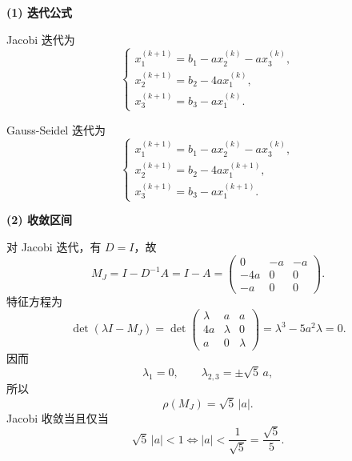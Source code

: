 \documentclass[11pt, a4paper]{ctexart}
\begin{document}
\begin{solution}
    \textbf{(1) 迭代公式}

    Jacobi 迭代为
    \[
        \begin{cases}
            x_1^{(k+1)} = b_1 - a x_2^{(k)} - a x_3^{(k)}, \\
            x_2^{(k+1)} = b_2 - 4a x_1^{(k)}, \\
            x_3^{(k+1)} = b_3 - a x_1^{(k)}.
        \end{cases}
    \]

    Gauss-Seidel 迭代为
    \[
        \begin{cases}
            x_1^{(k+1)} = b_1 - a x_2^{(k)} - a x_3^{(k)}, \\
            x_2^{(k+1)} = b_2 - 4a x_1^{(k+1)}, \\
            x_3^{(k+1)} = b_3 - a x_1^{(k+1)}.
        \end{cases}
    \]

    \textbf{(2) 收敛区间}

    对 Jacobi 迭代，有 $D = I$，故
    \[
        M_J = I - D^{-1}A = I - A
        =
        \begin{pmatrix}
            0 & -a & -a \\
            -4a & 0 & 0 \\
            -a & 0 & 0
        \end{pmatrix}.
    \]
    特征方程为
    \[
        \det(\lambda I - M_J)
        =
        \det
        \begin{pmatrix}
            \lambda & a & a \\
            4a & \lambda & 0 \\
            a & 0 & \lambda
        \end{pmatrix}
        =
        \lambda^3 - 5a^2 \lambda
        = 0.
    \]
    因而
    \[
        \lambda_1 = 0,\qquad
        \lambda_{2,3} = \pm \sqrt{5}\,a,
    \]
    所以
    \[
        \rho(M_J) = \sqrt{5}\,|a|.
    \]
    Jacobi 收敛当且仅当
    \[
        \sqrt{5}\,|a| < 1
        \iff
        |a| < \frac{1}{\sqrt{5}}
        = \frac{\sqrt{5}}{5}.
    \]


\end{solution}
\end{document}
